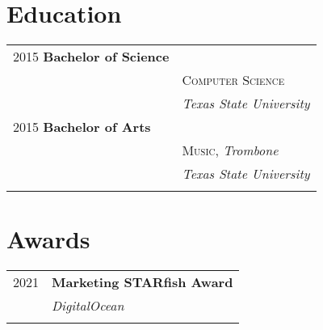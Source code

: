\documentclass[10pt]{article} %
\begin{document}
\begin{minipage}[t]{0.44\textwidth} %
\vspace{0pt} %



\section{Education} 

\begin{tabular}{ll} %

2015 \textbf{Bachelor of Science} \\ 
& \textsc{Computer Science} \\ 
& \textit{Texas State University}\\

     

2015 \textbf{Bachelor of Arts} \\ 
& \textsc{Music}, \textit{Trombone}\\ 
& \textit{Texas State University}\\ \\

\end{tabular}



\section{Awards} 

\begin{tabular}{rl}

2021     & \textbf{Marketing STARfish Award}\\
& \textit{DigitalOcean} \\\\


\end{tabular}
\end{minipage}
\end{document}
